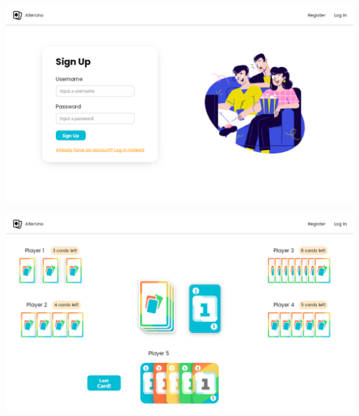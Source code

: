 \begin{center}
  \includegraphics[width=1\textwidth]{img/Mockup Sign Up}
   \label{fig:signupmockup}
\end{center}

\begin{center}
  \includegraphics[width=1\textwidth]{img/Mockup Game}
   \label{fig:gamemockup}
\end{center}


